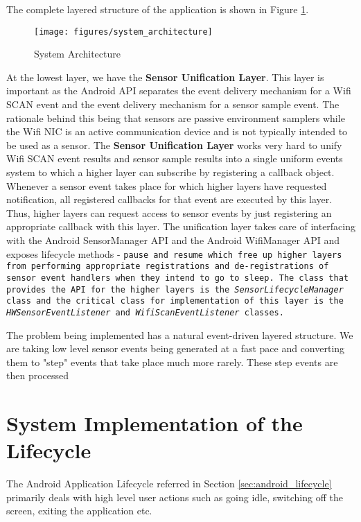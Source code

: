 The complete layered structure of the application is shown in Figure 
\ref{fig:system_architecture}. 

\begin{figure}
    \centering
    \texttt{[image: figures/system\_architecture]}
    \caption{System Architecture\label{fig:system_architecture}}
\end{figure}

At the lowest layer, we have the \textbf{Sensor Unification Layer}. This layer is 
important as the Android API separates the event delivery mechanism 
for a Wifi SCAN event and the event delivery mechanism for a sensor 
sample event. The rationale behind this being that sensors are passive 
environment samplers while the Wifi NIC is an active communication 
device and is not typically intended to be used as a sensor. The \textbf{Sensor 
Unification Layer} works very hard to unify Wifi SCAN event results and 
sensor sample results into a single uniform events system to which 
a higher layer can subscribe by registering a callback object. Whenever 
a sensor event takes place for which higher layers have requested notification,
all registered callbacks for that event are executed by this layer. Thus,
higher layers can request access to sensor events by just registering an 
appropriate callback with this layer. The unification layer takes care of 
interfacing with the Android SensorManager API and the Android WifiManager API
and exposes lifecycle methods - \tt{pause} and \tt{resume} which free up 
higher layers from performing appropriate registrations and de-registrations
of sensor event handlers when they intend to go to sleep. The class that 
provides the API for the higher layers is the \emph{SensorLifecycleManager} class
and the critical class for implementation of this layer is the 
\emph{HWSensorEventListener} and \emph{WifiScanEventListener} classes. 






The problem being implemented has a natural event-driven layered structure. 
We are taking
low level sensor events being generated at a fast pace and converting 
them to "step" events that take place much more rarely. These step events 
are then processed 

\section{System Implementation of the Lifecycle}

The Android Application Lifecycle referred in Section \ref{sec:android_lifecycle}
primarily deals with high level user actions such as going idle, switching 
off the screen, exiting the application etc. 



